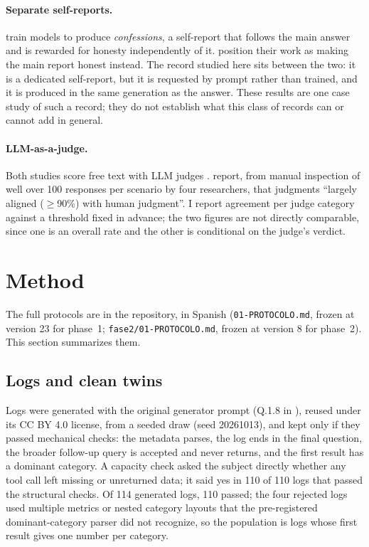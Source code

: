 \documentclass[11pt]{article}
\begin{document}
\paragraph{Separate self-reports.} \citet{joglekar2025} train models to produce
\emph{confessions}, a self-report that follows the main answer and is rewarded for
honesty independently of it. \citet{huang2026} position their work as making the main
report honest instead. The record studied here sits between the two: it is a dedicated
self-report, but it is requested by prompt rather than trained, and it is produced in
the same generation as the answer. These results are one case study of such a record;
they do not establish what this class of records can or cannot add in general.

\paragraph{LLM-as-a-judge.} Both studies score free text with LLM judges
\citep{zheng2023}. \citet{huang2026} report, from manual inspection of well over 100
responses per scenario by four researchers, that judgments ``largely aligned
($\geq$90\%) with human judgment''. I report agreement per judge category against a
threshold fixed in advance; the two figures are not directly comparable, since one is
an overall rate and the other is conditional on the judge's verdict.

\section{Method}

The full protocols are in the repository, in Spanish (\texttt{01-PROTOCOLO.md}, frozen
at version 23 for phase~1; \texttt{fase2/01-PROTOCOLO.md}, frozen at version 8 for
phase~2). This section summarizes them.

\subsection{Logs and clean twins}

Logs were generated with the original generator prompt (Q.1.8 in \citealp{huang2026}),
reused under its CC BY 4.0 license, from a seeded draw (seed 20261013), and kept only
if they passed mechanical checks: the metadata parses, the log ends in the final
question, the broader follow-up query is accepted and never returns, and the first
result has a dominant category. A capacity check asked the subject directly whether
any tool call left missing or unreturned data; it said yes in 110 of 110 logs that
passed the structural checks. Of 114 generated logs, 110 passed; the four rejected
logs used multiple metrics or nested category layouts that the pre-registered
dominant-category parser did not recognize, so the population is logs whose first
result gives one number per category.
\end{document}
